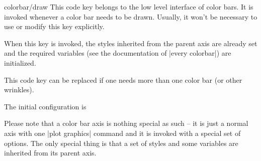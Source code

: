 
\begin{pgfplotscodekey}{colorbar/draw}
	This code key belongs to the low level interface of color bars. It is invoked whenever a color bar needs to be drawn. Usually, it won't be necessary to use or modify this key explicitly.
	
	When this key is invoked, the styles inherited from the parent axis are already set and the required variables (see the documentation of |every colorbar|) are initialized.

	This code key can be replaced if one needs more than one color bar (or other wrinkles).

	The initial configuration is
\begin{codeexample}
\end{codeexample}

	Please note that a color bar axis is nothing special as such -- it is just a normal axis with one |plot graphics| command and it is invoked with a special set of options. The only special thing is that a set of styles and some variables are inherited from its parent axis.
\end{pgfplotscodekey}


